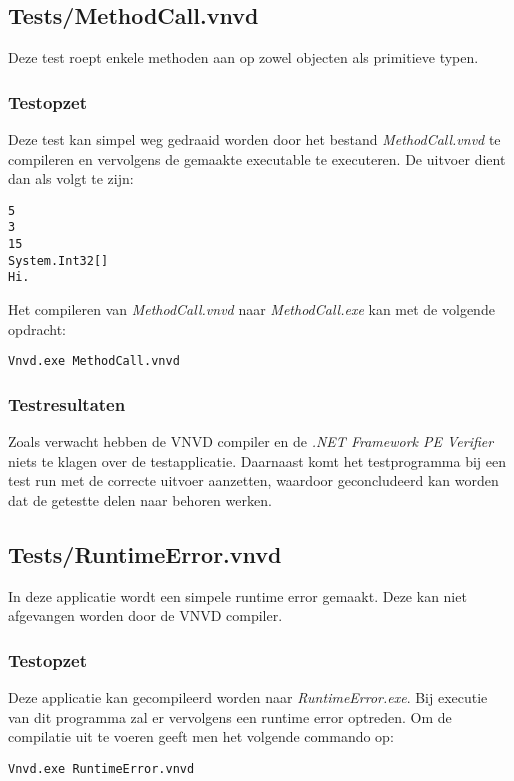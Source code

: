 \subsection{Tests/MethodCall.vnvd}
Deze test roept enkele methoden aan op zowel objecten als primitieve typen.

\subsubsection{Testopzet}
Deze test kan simpel weg gedraaid worden door het bestand \textit{MethodCall.vnvd} te compileren en vervolgens de gemaakte executable te executeren. De uitvoer dient dan als volgt te zijn:

\begin{lstlisting}
5
3
15
System.Int32[]
Hi.
\end{lstlisting}

Het compileren van \textit{MethodCall.vnvd} naar \textit{MethodCall.exe} kan met de volgende opdracht:

\begin{lstlisting}
Vnvd.exe MethodCall.vnvd
\end{lstlisting}

\subsubsection{Testresultaten}
Zoals verwacht hebben de VNVD compiler en de \textit{.NET Framework PE Verifier} niets te klagen over de testapplicatie. Daarnaast komt het testprogramma bij een test run met de correcte uitvoer aanzetten, waardoor geconcludeerd kan worden dat de getestte delen naar behoren werken.

\subsection{Tests/RuntimeError.vnvd}
In deze applicatie wordt een simpele runtime error gemaakt. Deze kan niet afgevangen worden door de VNVD compiler.

\subsubsection{Testopzet}
Deze applicatie kan gecompileerd worden naar \textit{RuntimeError.exe}. Bij executie van dit programma zal er vervolgens een runtime error optreden. Om de compilatie uit te voeren geeft men het volgende commando op:

\begin{lstlisting}
Vnvd.exe RuntimeError.vnvd
\end{lstlisting}


